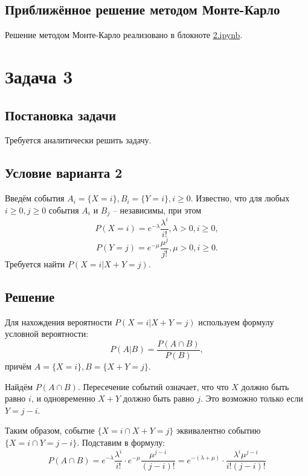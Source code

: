 \documentclass[a4paper,14pt]{extarticle}
\begin{document}
        \subsection*{Приближённое решение методом Монте-Карло}
            Решение методом Монте-Карло реализовано в блокноте \href{https://github.com/vorandpav/TVIPS}{2.ipynb}.


    
    
    \section*{Задача 3}
        
        \subsection*{Постановка задачи}
            
            Требуется аналитически решить задачу.
        
        \subsection*{Условие варианта 2}
            
            Введём события \( A_i = \{X = i\}, B_i = \{Y = i\}, i \geq 0 \). Известно, что для любых \( i \geq 0, j \geq 0 \) события \( A_i \) и \( B_j \) -- независимы, при этом
            \[ P(X = i) = e^{-\lambda} \frac{\lambda^i}{i!}, \lambda > 0, i \geq 0, \]
            \[ P(Y = j) = e^{-\mu} \frac{\mu^j}{j!}, \mu > 0, i \geq 0. \]
            Требуется найти \( P(X = i | X + Y = j) \).
        
        \subsection*{Решение}
            
            Для нахождения вероятности \( P(X = i | X + Y = j) \) используем формулу условной вероятности:
            \[ P(A|B) = \frac{P( A \cap B)}{P(B)}, \]
            причём \(A = \{X = i\}, B = \{X + Y = j\}\).
            
            Найдём \(P( A \cap B)\). Пересечение событий означает, что что \(X\) должно быть равно \(i\), и одновременно \(X+Y\) должно быть равно \(j\). Это возможно только если \(Y=j-i\).
            
            Таким образом, событие \(\{X = i \cap X + Y = j\}\) эквивалентно событию \(\{X = i \cap Y = j - i\}\). Подставим в формулу:
            \[P(A \cap B ) =  e^{-\lambda} \frac{\lambda^i}{i!} \cdot e^{-\mu} \frac{\mu^{j-i}}{(j-i)!} = e^{-(\lambda + \mu)} \cdot \frac{\lambda^i \mu^{j-i}}{i!(j-i)!}\]
            
\end{document}
